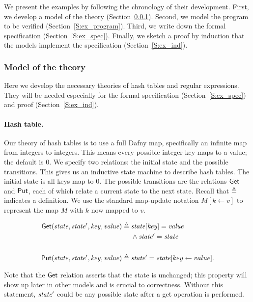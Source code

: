 We present the examples by following the chronology of their development. First,
we develop a model of the theory (Section~\ref{S:ex_theory}). Second, we model
the program to be verified (Section~\ref{S:ex_program}). Third, we write down
the formal specification (Section~\ref{S:ex_spec}). Finally, we sketch a proof
by induction that the models implement the specification
(Section~\ref{S:ex_ind}).

\subsubsection{Model of the theory}\label{S:ex_theory}

Here we develop the necessary theories of hash tables and regular expressions.
They will be needed especially for the formal specification
(Section~\ref{S:ex_spec}) and proof (Section~\ref{S:ex_ind}).

\paragraph{Hash table.} Our theory of hash tables is to use a full Dafny map,
specifically an infinite map from integers to integers. This means every
possible integer key maps to a value; the default is 0. We specify two
relations: the initial state and the possible transitions. This gives us an
inductive state machine to describe hash tables. The initial state is all keys
map to 0. The possible transitions are the relations \(\mathsf{Get}\) and
\(\mathsf{Put}\), each of which relate a current state to the next state. Recall
that \(\triangleq\) indicates a definition. We use the standard map-update
notation \(M[k \gets v]\) to represent the map \(M\) with \(k\) now mapped to
\(v\).

\begin{align*}
    \mathsf{Get}(\mathit{state}, \mathit{state'}, \mathit{key}, \mathit{value}) \triangleq\;&
    \mathit{state}[\mathit{key}] = \mathit{value} \\
    & \land \mathit{state'} = \mathit{state} \\
    \\
    \mathsf{Put}(\mathit{state}, \mathit{state'}, \mathit{key}, \mathit{value}) \triangleq\;&
    \mathit{state'} = \mathit{state}[key \gets value].
\end{align*}

Note that the \(\mathsf{Get}\) relation asserts that the state is unchanged; this
property will show up later in other models and is crucial to correctness.
Without this statement, \(\mathit{state'}\) could be any possible state after a get
operation is performed.

